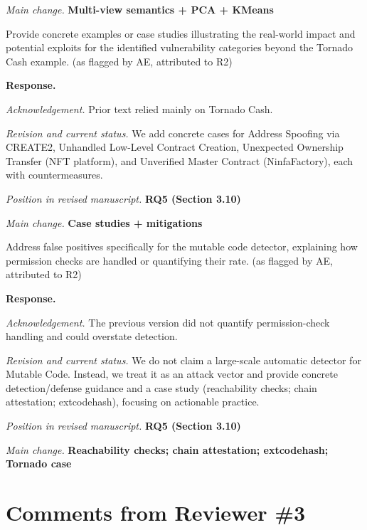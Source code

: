 \documentclass[acmsmall]{acmart}
\begin{document}
	\textit{Main change.} {\color{blue}\textbf{Multi-view semantics + PCA + KMeans}}

	\begin{tcolorbox}
		[commentbox,title=Reviewer \#2 -- Comment 3] Provide concrete examples or case studies illustrating
		the real-world impact and potential exploits for the identified vulnerability categories beyond
		the Tornado Cash example. (as flagged by AE, attributed to R2)
	\end{tcolorbox}

	\noindent
	\textbf{Response.}

	\textit{Acknowledgement.} Prior text relied mainly on Tornado Cash.

	\textit{Revision and current status.} We add concrete cases for Address Spoofing via CREATE2,
	Unhandled Low-Level Contract Creation, Unexpected Ownership Transfer (NFT platform), and
	Unverified Master Contract (NinfaFactory), each with countermeasures.

	\textit{Position in revised manuscript.} {\color{red}\textbf{RQ5 (Section 3.10)}}

	\textit{Main change.} {\color{blue}\textbf{Case studies + mitigations}}

	\begin{tcolorbox}
		[commentbox,title=Reviewer \#2 -- Comment 4] Address false positives specifically for the mutable
		code detector, explaining how permission checks are handled or quantifying their rate. (as
		flagged by AE, attributed to R2)
	\end{tcolorbox}

	\noindent
	\textbf{Response.}

	\textit{Acknowledgement.} The previous version did not quantify permission-check handling and could
	overstate detection.

	\textit{Revision and current status.} We do not claim a large-scale automatic detector for
	Mutable Code. Instead, we treat it as an attack vector and provide concrete detection/defense
	guidance and a case study (reachability checks; chain attestation; extcodehash), focusing on actionable
	practice.

	\textit{Position in revised manuscript.} {\color{red}\textbf{RQ5 (Section 3.10)}}

	\textit{Main change.}
	{\color{blue}\textbf{Reachability checks; chain attestation; extcodehash; Tornado case}}

	\newpage
	\section{Comments from Reviewer \#3}
\end{document}
